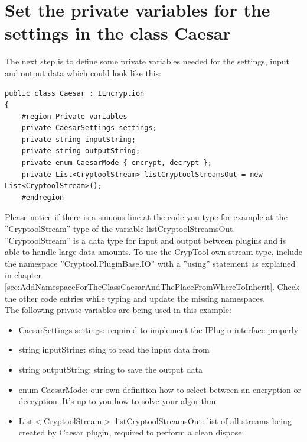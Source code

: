 \section{Set the private variables for the settings in the class Caesar}\label{sec:SetThePrivateVariablesForTheSettingsInTheClassCaesar}
The next step is to define some private variables needed for the settings, input and output data which could look like this:
\begin{lstlisting}
public class Caesar : IEncryption
{
	#region Private variables
	private CaesarSettings settings;
	private string inputString;
	private string outputString;
	private enum CaesarMode { encrypt, decrypt };
	private List<CryptoolStream> listCryptoolStreamsOut = new List<CryptoolStream>();
	#endregion
\end{lstlisting}
Please notice if there is a sinuous line at the code you type for example at the ''CryptoolStream'' type of the variable listCryptoolStreamsOut. ''CryptoolStream'' is a data type for input and output between plugins and is able to handle large data amounts. To use the CrypTool own stream type, include the namespace ''Cryptool.PluginBase.IO'' with a ''using'' statement as explained in chapter \ref{sec:AddNamespaceForTheClassCaesarAndThePlaceFromWhereToInherit}. Check the other code entries while typing and update the missing namespaces.\\
The following private variables are being used in this example:
\begin{itemize}
	\item CaesarSettings settings: required to implement the IPlugin interface properly
	\item string inputString: sting to read the input data from
	\item string outputString: string to save the output data
	\item enum CaesarMode: our own definition how to select between an encryption or decryption. It's up to you how to solve your algorithm
	\item List$<$CryptoolStream$>$ listCryptoolStreamsOut: list of all streams being created by Caesar plugin, required to perform a clean dispose
\end{itemize}
